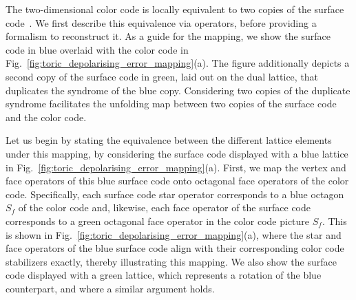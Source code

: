 \documentclass[a4paper,twocolumn,11pt,accepted=2024-12-23]{quantumarticle}
\begin{document}

The two-dimensional color code is locally equivalent to two copies of the surface code~\cite{yoshida2011classification, bombin2012universal, Bhagoji15, Kubica_2015, criger2016noise}. We first describe this equivalence via operators, before providing a formalism to reconstruct it. As a guide for the mapping, we show the surface code in blue overlaid with the color code in Fig.~\ref{fig:toric_depolarising_error_mapping}(a). The figure additionally depicts a second copy of the surface code in green, laid out on the dual lattice, that duplicates the syndrome of the blue copy. Considering two copies of the duplicate syndrome facilitates the unfolding map between two copies of the surface code and the color code.

Let us begin by stating the equivalence between the different lattice elements under this mapping, by considering the surface code displayed with a blue lattice in Fig.~\ref{fig:toric_depolarising_error_mapping}(a). First, we map the vertex and face operators of this blue surface code onto octagonal face operators of the color code. Specifically, each surface code star operator corresponds to a blue octagon $S_f$ of the color code and, likewise, each face operator of the surface code corresponds to a green octagonal face operator in the color code picture $S_f$. This is shown in Fig.~\ref{fig:toric_depolarising_error_mapping}(a), where the star and face operators of the blue surface code align with their corresponding color code stabilizers exactly, thereby illustrating this mapping. We also show the surface code displayed with a green lattice, which represents a rotation of the blue counterpart, and where a similar argument holds.
\end{document}
